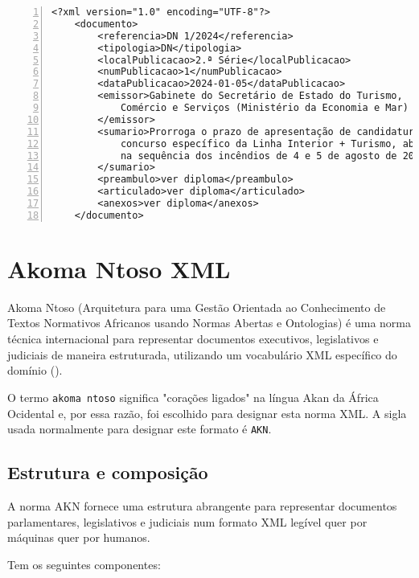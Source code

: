 \begin{Verbatim}[frame=single, numbers=left, fontsize=\small, commandchars=\\\{\}]
<?xml version="1.0" encoding="UTF-8"?>
    <documento>
        <referencia>DN 1/2024</referencia>
        <tipologia>DN</tipologia>
        <localPublicacao>2.ª Série</localPublicacao>
        <numPublicacao>1</numPublicacao>
        <dataPublicacao>2024-01-05</dataPublicacao>
        <emissor>Gabinete do Secretário de Estado do Turismo, 
            Comércio e Serviços (Ministério da Economia e Mar)
        </emissor>
        <sumario>Prorroga o prazo de apresentação de candidaturas ao 
            concurso específico da Linha Interior + Turismo, aberto 
            na sequência dos incêndios de 4 e 5 de agosto de 2023
        </sumario>
        <preambulo>ver diploma</preambulo>
        <articulado>ver diploma</articulado>
        <anexos>ver diploma</anexos>
    </documento>
\end{Verbatim}


\section{Akoma Ntoso XML}
\label{akn}

Akoma Ntoso (Arquitetura para uma Gestão Orientada ao Conhecimento de Textos Normativos Africanos usando Normas Abertas e Ontologias) 
é uma norma técnica internacional para representar documentos executivos, legislativos e judiciais de maneira estruturada, 
utilizando um vocabulário XML específico do domínio (\cite{VPCB2018}).

O termo \texttt{akoma ntoso} significa "corações ligados" na língua Akan da África Ocidental e, por essa razão, foi escolhido 
para designar esta norma XML. A sigla usada normalmente para designar este formato é \texttt{AKN}.

\subsection{Estrutura e composição}

A norma AKN fornece uma estrutura abrangente para representar documentos parlamentares, legislativos e judiciais 
num formato XML legível quer por máquinas quer por humanos. 

Tem os seguintes componentes:

